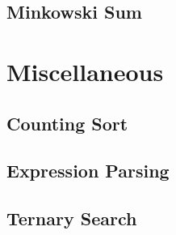 \subsection{Minkowski Sum}
\raggedbottom
\hrulefill

\section{Miscellaneous}
\subsection{Counting Sort}
\raggedbottom
\hrulefill
\subsection{Expression Parsing}
\raggedbottom
\hrulefill
\subsection{Ternary Search}
\raggedbottom
\hrulefill

